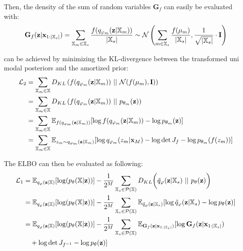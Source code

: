 Then, the density of the sum of random variables $\textbf{G}_f$ can easily be evaluated with:
\begin{equation}
    \textbf{G}_f(\textbf{z}|\textbf{x}_{1:|\mathbb{X}_s|}) =\sum _{\mathbb{X}_m \in \mathbb{X}_s} \frac{f(q_{\varphi_m}(\textbf{z}|\mathbb{X}_m))}{|\mathbb{X}_s|} \sim \mathcal{N} \left(  \sum _{m \in \mathbb{X}_s} \frac{f(\mu_m)}{|\mathbb{X}_s|}, \frac{1}{\sqrt{|\mathbb{X}_s|}}  \cdot \textbf{I} \right)
\end{equation}

 can be achieved by minimizing the KL-divergence between the transformed uni modal posteriors and the amortized prior:
\begin{equation}
    \begin{split}
        \mathcal{L}_2 &= \sum _{\xsetm \in \xset} D_{KL}\left( f(\unimodalpost)\ ||\ \mathcal{N}(f(\mu_m), \textbf{I}) \right)\\
        &= \sum _{\xsetm \in \xset} D_{KL}\left( f(\unimodalpost)\ ||\ p_{\theta_m}(\textbf{z}) \right)\\
        &=  \sum _{\xsetm \in \xset} \mathbb{E}_{f(\unimodalpost)} [\log f(\unimodalpost) - \log p_{\theta_m}(\textbf{z})]\\
        &=  \sum _{\xsetm \in \xset} \mathbb{E}_{z_m \sim \unimodalpost} [\log q_{\phi_m}(z_m|\textbf{x}_M) - \log \det J_f  - \log p_{\theta_m}(f(z_m))]\\
    \end{split}
\end{equation}

The ELBO can then be evaluated as following:
\begin{equation}
    \begin{split}
        \mathcal{L}_1 &=  \mathbb{E}_{q_{\phi}(\textbf{z}|\mathbb{X})}[\log (p_{\theta}(\mathbb{X}|\textbf{z}))] -  \frac{1}{2^M} \sum _{\mathbb{X}_s \in \mathcal{P}(\mathbb{X})} D_{KL}\biggl( \tilde{q}_{\phi}(\textbf{z}|\mathbb{X}_s)\ ||\ p_{\theta}(\textbf{z})\biggr)\\
        &= \mathbb{E}_{q_{\phi}(\textbf{z}|\mathbb{X})}[\log (p_{\theta}(\mathbb{X}|\textbf{z}))] - \frac{1}{2^M} \sum _{\mathbb{X}_s \in \mathcal{P}(\mathbb{X})} \mathbb{E}_{\tilde{q}_{\phi}(\textbf{z}|\mathbb{X}_s)}[\log \tilde{q}_{\phi}(\textbf{z}|\mathbb{X}_s) - \log p_{\theta}(\textbf{z}) ]\\
        &= \mathbb{E}_{q_{\phi}(\textbf{z}|\mathbb{X})}[\log (p_{\theta}(\mathbb{X}|\textbf{z}))] - \frac{1}{2^M} \sum _{\mathbb{X}_s \in \mathcal{P}(\mathbb{X})} \mathbb{E}_{\textbf{G}_f(\textbf{z}|\textbf{x}_{1:|\xsubset|})}[\log \textbf{G}_f(\textbf{z}|\textbf{x}_{1:|\xsubset|})\\
        &\quad + \log \det J_{f^{-1}}- \log p_{\theta}(\textbf{z}) ]
    \end{split}
\end{equation}

